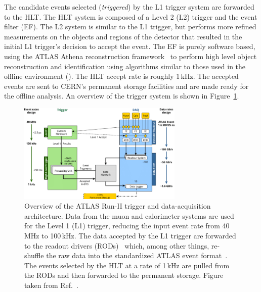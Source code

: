 The candidate events selected (\textit{triggered}) by the L1 trigger system are forwarded to the HLT.
The HLT system is composed of a Level 2 (L2) trigger and the event filter (EF).
The L2 system is similar to the L1 trigger, but performs more refined measurements on the objects and
regions of the detector that resulted in the initial L1 trigger's decision to accept the event.
The EF is purely software based, using the ATLAS Athena reconstruction framework~\cite{AthenaRef}
to perform high level object reconstruction and identification using algorithms similar to those used
in the offline environment ({\color{red}{Section XXX}}).
The HLT accept rate is roughly 1\,kHz.
The accepted events are sent to CERN's permanent storage facilities and are made ready for the offline analysis.
An overview of the trigger system is shown in Figure~\ref{fig:run2_trigger}.


\begin{figure}[!htb]
    \begin{center}
        \includegraphics[width=0.7\textwidth]{figures/chapter2/tdaq/atlas_run2_trigger_system}
        \caption{
            Overview of the ATLAS Run-II trigger and data-acquisition architecture.
            Data from the muon and calorimeter systems are used for the Level 1 (L1) trigger, reducing
            the input event rate from 40\,MHz to 100\,kHz.
            The data accepted by the L1 trigger are forwarded to the readout drivers (RODs)~\cite{Jenni:616089}
            which, among other things, re-shuffle the raw data into the standardized ATLAS event format~\cite{Bee:683741}.
            The events selected by the HLT at a rate of 1\,kHz are pulled from the RODs and then forwarded to the permanent
            storage.
            Figure taken from Ref.~\cite{PanduroVazquez:2244345}.
        }
        \label{fig:run2_trigger}
    \end{center}
\end{figure}
